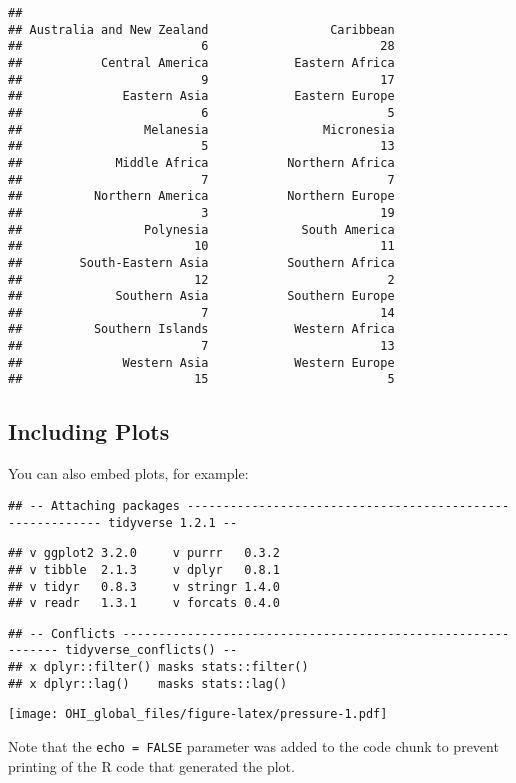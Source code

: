 \documentclass[]{article}
\begin{document}
\begin{verbatim}
## 
## Australia and New Zealand                 Caribbean 
##                         6                        28 
##           Central America            Eastern Africa 
##                         9                        17 
##              Eastern Asia            Eastern Europe 
##                         6                         5 
##                 Melanesia                Micronesia 
##                         5                        13 
##             Middle Africa           Northern Africa 
##                         7                         7 
##          Northern America           Northern Europe 
##                         3                        19 
##                 Polynesia             South America 
##                        10                        11 
##        South-Eastern Asia           Southern Africa 
##                        12                         2 
##             Southern Asia           Southern Europe 
##                         7                        14 
##          Southern Islands            Western Africa 
##                         7                        13 
##              Western Asia            Western Europe 
##                        15                         5
\end{verbatim}

\hypertarget{including-plots}{%
\subsection{Including Plots}\label{including-plots}}

You can also embed plots, for example:

\begin{verbatim}
## -- Attaching packages ---------------------------------------------------------- tidyverse 1.2.1 --
\end{verbatim}

\begin{verbatim}
## v ggplot2 3.2.0     v purrr   0.3.2
## v tibble  2.1.3     v dplyr   0.8.1
## v tidyr   0.8.3     v stringr 1.4.0
## v readr   1.3.1     v forcats 0.4.0
\end{verbatim}

\begin{verbatim}
## -- Conflicts ------------------------------------------------------------- tidyverse_conflicts() --
## x dplyr::filter() masks stats::filter()
## x dplyr::lag()    masks stats::lag()
\end{verbatim}

\texttt{[image: OHI\_global\_files/figure-latex/pressure-1.pdf]}

Note that the \texttt{echo\ =\ FALSE} parameter was added to the code
chunk to prevent printing of the R code that generated the plot.
\end{document}
